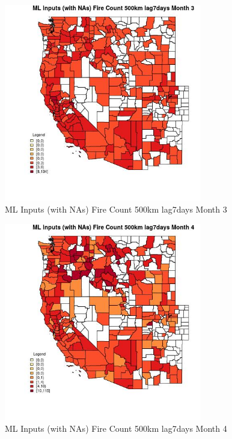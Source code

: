 \begin{figure} 
\centering  
\includegraphics[width=0.77\textwidth]{Code_Outputs/Report_ML_input_PM25_Step4_part_e_de_duplicated_aves_compiled_2019-05-21wNAs_CountyFire_Count_500km_lag7daysmedianMonth3.jpg} 
\caption{\label{fig:Report_ML_input_PM25_Step4_part_e_de_duplicated_aves_compiled_2019-05-21wNAsCountyFire_Count_500km_lag7daysmedianMonth3}ML Inputs (with NAs) Fire Count 500km lag7days Month 3} 
\end{figure} 
 

\begin{figure} 
\centering  
\includegraphics[width=0.77\textwidth]{Code_Outputs/Report_ML_input_PM25_Step4_part_e_de_duplicated_aves_compiled_2019-05-21wNAs_CountyFire_Count_500km_lag7daysmedianMonth4.jpg} 
\caption{\label{fig:Report_ML_input_PM25_Step4_part_e_de_duplicated_aves_compiled_2019-05-21wNAsCountyFire_Count_500km_lag7daysmedianMonth4}ML Inputs (with NAs) Fire Count 500km lag7days Month 4} 
\end{figure} 
 

